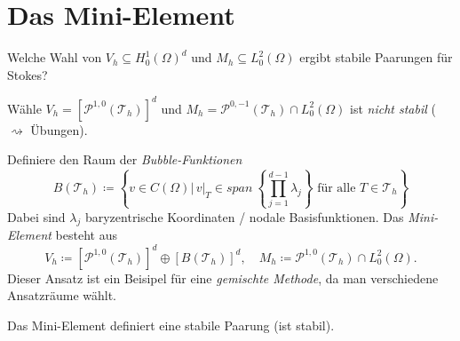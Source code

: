\documentclass[../skript.tex]{subfiles}
\begin{document}
\section{Das Mini-Element}\label{sec:c3e4}
Welche Wahl von $V_h\subseteq H^1_0(\Omega)^d$ und $M_h\subseteq L^2_0(\Omega)$ ergibt stabile Paarungen für Stokes?\newline\newline\noindent
\begin{example}\label{ex:c3e4s1}
	Wähle $V_h = \left[\mathcal{P}^{1,0}(\mathcal{T}_h)\right]^d$ und $M_h = \mathcal{P}^{0,-1}(\mathcal{T}_h)\cap L^2_0(\Omega)$
	ist \emph{nicht stabil} ($\rightsquigarrow$ Übungen).
\end{example}
\begin{definition}\label{def:c3e4s2}
	Definiere den Raum der \emph{Bubble-Funktionen}
	\[
		B(\mathcal{T}_h) \coloneqq \left\{ v\in C(\Omega)\bigg|\,v|_T\in span\:\left\{ \prod_{j=1}^{d-1}\lambda_j \right\}\text{ für alle }T\in\mathcal{T}_h \right\}
	\]
	Dabei sind $\lambda_j$ baryzentrische Koordinaten / nodale Basisfunktionen.\newline\noindent
	Das \emph{Mini-Element} besteht aus
	\[
		V_h \coloneqq \left[ \mathcal{P}^{1,0}(\mathcal{T}_h) \right]^d \oplus \left[ B(\mathcal{T}_h) \right]^d,\quad M_h\coloneqq \mathcal{P}^{1,0}(\mathcal{T}_h)\cap L^2_0(\Omega).
	\]
	Dieser Ansatz ist ein Beisipel für eine \emph{gemischte Methode}, da man verschiedene Ansatzräume wählt.
\end{definition}

\begin{theorem}\label{thm:c3e4s3}
	Das Mini-Element definiert eine stabile Paarung (ist stabil).
\end{theorem}
\end{document}
